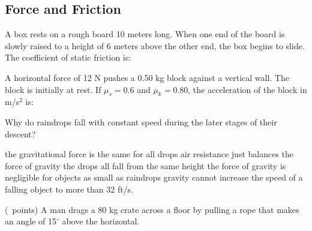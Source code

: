 \begin{questions}
  \section{Force and Friction}
  
  \question[2] A box rests on a rough board 10 meters long. When one
  end of the board is slowly raised to a height of 6 meters above the
  other end, the box begins to slide. The coefficient of static
  friction is:
  \begin{oneparchoices}
  \end{oneparchoices}

  \question[2] A horizontal force of 12 N pushes a 0.50 kg block
  against a vertical wall. The block is initially at rest. If $\mu_s =
  0.6$ and $\mu_k = 0.80$, the acceleration of the block in m/s$^2$
  is:
  \begin{oneparchoices}
  \end{oneparchoices}

  \question[2] Why do raindrops fall with constant speed during the
  later stages of their descent?
  \begin{oneparchoices}
    \choice the gravitational force is the same for all drops
    \CorrectChoice air resistance just balances the force of gravity
    \choice the drops all fall from the same height
    \choice the force of gravity is negligible for objects as small as
    raindrops
    \choice gravity cannot increase the speed of a falling object to
    more than 32 ft/s.
  \end{oneparchoices}

  \question (\totalpoints\ points) A man drags a 80 kg crate across a
  floor by pulling a rope that makes an angle of 15$^\circ$ above the
  horizontal.
\end{questions}
